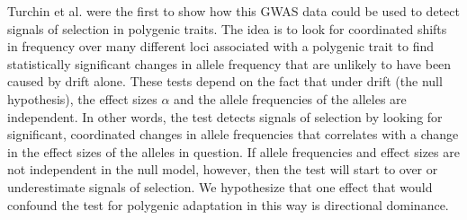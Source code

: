 \documentclass[a4paper,12pt]{article}
\begin{document}
Turchin et al. \cite{heightselection} were the first to show how this
GWAS data could be used to detect signals of selection in polygenic
traits. The idea is to look for coordinated shifts in frequency over
many different loci associated with a polygenic trait to find
statistically significant changes in allele frequency that are
unlikely to have been caused by drift alone. These tests depend on the
fact that under drift (the null hypothesis), the effect sizes $\alpha$
and the allele frequencies of the alleles are independent. In
other words, the test detects signals of selection by looking for
significant, coordinated changes in allele frequencies that correlates
with a change in the effect sizes of the alleles in question. If
allele frequencies and effect sizes are not independent in the null
model, however, then the test will start to over or underestimate
signals of selection. We hypothesize that one effect that would
confound the test for polygenic adaptation in this way is directional dominance.
\end{document}
